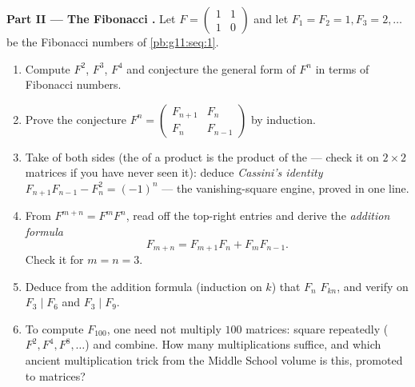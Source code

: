\begin{problem}
\medskip
\noindent\textbf{Part II --- The Fibonacci .}
Let $F = \begin{pmatrix} 1 & 1\\ 1 & 0\end{pmatrix}$ and let
$F_1 = F_2 = 1, F_3 = 2, \dots$ be the Fibonacci numbers of
\cref{pb:g11:seq:1}.
\begin{enumerate}[resume]
  \item Compute $F^2$, $F^3$, $F^4$ and conjecture the general
        form of $F^n$ in terms of Fibonacci numbers.
  \item Prove the conjecture
        $F^n = \begin{pmatrix} F_{n+1} & F_n\\ F_n & F_{n-1}
        \end{pmatrix}$ by induction.
  \item Take  of both sides (the  of a
        product is the product of the  --- check it
        on $2 \times 2$ matrices if you have never seen it):
        deduce \emph{Cassini's identity}
        $F_{n+1}F_{n-1} - F_n^2 = (-1)^n$ --- the
        vanishing-square engine, proved in one line.
  \item From $F^{m+n} = F^m F^n$, read off the top-right
        entries and derive the \emph{addition formula}
        \[
        F_{m+n} = F_{m+1} F_n + F_m F_{n-1} .
        \]
        Check it for $m = n = 3$.
  \item Deduce from the addition formula (induction on $k$)
        that $F_n$  $F_{kn}$, and verify on
        $F_3 \mid F_6$ and $F_3 \mid F_9$.
  \item To compute $F_{100}$, one need not multiply $100$
        matrices: square repeatedly ($F^2, F^4, F^8, \dots$)
        and combine. How many  multiplications suffice,
        and which ancient multiplication trick from the Middle
        School volume is this, promoted to matrices?
\end{enumerate}


\end{problem}
